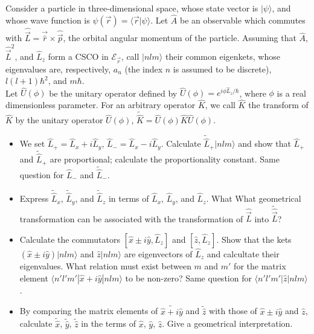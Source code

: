 \documentclass[10pt,a4paper]{article}
\newenvironment{problem}[2][Problem]{\begin{trivlist}
\item[\hskip \labelsep {\bfseries #1}\hskip \labelsep {\bfseries #2.}]}{\end{trivlist}}
\begin{document}
\begin{problem}{3}
[C-T Exercise 6-8] Consider a particle in three-dimensional space, whose state vector is $|\psi\rangle$, and whose wave function is $\psi(\vec{r})=\langle\vec{r}|\psi\rangle$. Let $\hat{A}$ be an observable which commutes with $\hat{\vec{L}}=\vec{\hat{r}}\times\hat{\vec{p}}$, the orbital angular momentum of the particle. Assuming that $\hat{A}$, $\hat{\vec{L}}^2$, and $\hat{L}_z$ form a CSCO in $\mathscr{E}_{\vec{r}}$, call $|nlm\rangle$ their common eigenkets, whose eigenvalues are, respectively, $a_n$ (the index $n$ is assumed to be discrete), $l(l+1)\hbar^2$, and $m\hbar$.\\
Let $\hat{U}(\phi)$ be the unitary operator defined by $\hat{U}(\phi)=e^{i\phi\hat{L}_z/\hbar}$, where $\phi$ is a real dimensionless parameter. For an arbitrary operator $\hat{K}$, we call $\hat{K}$ the transform of $\hat{K}$ by the unitary operator $\hat{U}(\phi)$, $\tilde{\hat{K}}=\hat{U}(\phi)\hat{K}\hat{U}(\phi)$.
\begin{itemize}
\item[(a)] We set $\hat{L}_+=\hat{L}_x+i\hat{L}_y$, $\hat{L}_-=\hat{L}_x-i\hat{L}_y$. Calculate $\tilde{\hat{L}}_+|nlm\rangle$ and show that $\hat{L}_+$ and $\tilde{\hat{L}}_+$ are proportional; calculate the proportionality constant. Same question for $\hat{L}_-$ and $\tilde{\hat{L}}_-$.
\item[(b)] Express $\tilde{\hat{L}}_x$, $\tilde{\hat{L}}_y$, and $\tilde{\hat{L}}_z$ in terms of $\hat{L}_x$, $\hat{L}_y$, and $\hat{L}_z$. What What geometrical transformation can be associated with the transformation of $\hat{\vec{L}}$ into $\tilde{\hat{\vec{L}}}$?
\item[(c)] Calculate the commutators $[\hat{x}\pm i\hat{y},\hat{L}_z]$ and $[\hat{z},\hat{L}_z]$. Show that the kets $(\hat{x}\pm i\hat{y})|nlm\rangle$ and $\hat{z}|nlm\rangle$ are eigenvectors of $\hat{L}_z$ and calcultate their eigenvalues. What relation must exist between $m$ and $m'$ for the matrix element $\langle n'l'm'|\hat{x}+i\hat{y}|nlm\rangle$ to be non-zero? Same question for $\langle n'l'm'|\hat{z}|nlm\rangle$.
\item[(d)] By comparing the matrix elements of $\widetilde{\hat{x}+i\hat{y}}$ and $\tilde{\hat{z}}$ with those of $\hat{x}\pm i\hat{y}$ and $\hat{z}$, calculate $\tilde{\hat{x}}$, $\tilde{\hat{y}}$, $\tilde{\hat{z}}$ in the terms of $\hat{x}$, $\hat{y}$, $\hat{z}$. Give a geometrical interpretation.
\end{itemize}
\end{problem}
\end{document}
